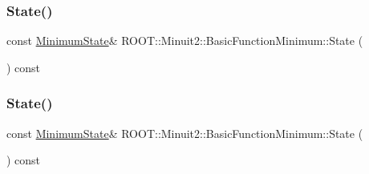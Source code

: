 \subsubsection{\texorpdfstring{State()}{State()}\hspace{0.1cm}{\footnotesize\ttfamily [1/2]}}
{\footnotesize\ttfamily const \mbox{\hyperlink{classROOT_1_1Minuit2_1_1MinimumState}{Minimum\+State}}\& R\+O\+O\+T\+::\+Minuit2\+::\+Basic\+Function\+Minimum\+::\+State (\begin{DoxyParamCaption}{ }\end{DoxyParamCaption}) const\hspace{0.3cm}{\ttfamily [inline]}}

\mbox{\label{classROOT_1_1Minuit2_1_1BasicFunctionMinimum_a57c7f1a6d3551fd329698e0fc9424fec}} 
\subsubsection{\texorpdfstring{State()}{State()}\hspace{0.1cm}{\footnotesize\ttfamily [2/2]}}
{\footnotesize\ttfamily const \mbox{\hyperlink{classROOT_1_1Minuit2_1_1MinimumState}{Minimum\+State}}\& R\+O\+O\+T\+::\+Minuit2\+::\+Basic\+Function\+Minimum\+::\+State (\begin{DoxyParamCaption}{ }\end{DoxyParamCaption}) const\hspace{0.3cm}{\ttfamily [inline]}}

